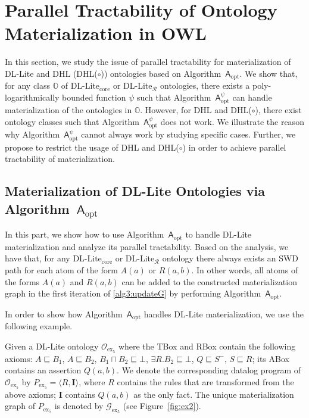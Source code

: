 \section{Parallel Tractability of Ontology Materialization in OWL}
\label{sec:ptonto}

In this section, we study the issue of parallel tractability
for materialization of DL-Lite and DHL (DHL($\circ$)) ontologies
based on Algorithm~$\mathsf{A}_{\text{opt}}$. We show that, for any class $\mathbb{O}$ of
DL-Lite$_{\text{core}}$ or DL-Lite$_\mathcal{R}$ ontologies,
there exists a poly-logarithmically bounded function $\psi$
such that Algorithm~$\mathsf{A}_{\text{opt}}^{\psi}$ can handle materialization of the ontologies in $\mathbb{O}$.
However, for DHL and DHL($\circ$), there exist ontology classes such that Algorithm~$\mathsf{A}_{\text{opt}}^\psi$
does not work. We illustrate the reason why Algorithm~$\mathsf{A}_{\text{opt}}^\psi$ cannot always
work by studying specific cases.
Further, we propose to restrict the usage of DHL and DHL($\circ$) in order to achieve parallel tractability
of materialization.

\subsection{Materialization of DL-Lite Ontologies via Algorithm~$\mathsf{A}_{\text{opt}}$}

In this part, we show how to use Algorithm~$\mathsf{A}_{\text{opt}}$ to handle
DL-Lite materialization and analyze its parallel tractability.
Based on the analysis, we have that, for any DL-Lite$_{\text{core}}$ or DL-Lite$_\mathcal{R}$ ontology
there always exists an SWD path for each atom of the form $A(a)$ or $R(a,b)$.
In other words, all atoms of the forms $A(a)$ and $R(a,b)$ can be added to
the constructed materialization graph in the first iteration of \ref{alg3:updateG}
by performing Algorithm~$\mathsf{A}_{\text{opt}}$.

In order to show how Algorithm~$\mathsf{A}_{\text{opt}}$ handles DL-Lite materialization,
we use the following example.

\begin{example}\label{exp:dllite}
Given a DL-Lite ontology $\mathcal{O}_{\text{ex}_5}$
where the TBox and RBox contain the following axioms:
$A\sqsubseteq B_1$, $A\sqsubseteq B_2$, $B_1\sqcap B_2\sqsubseteq\bot$,
$\exists R.B_2\sqsubseteq\bot$, $Q\sqsubseteq S^-$, $S\sqsubseteq R$;
its ABox contains an assertion $Q(a,b)$.
We denote the corresponding datalog program of $\mathcal{O}_{\text{ex}_5}$ by $P_{\text{ex}_5}=\langle R, \textbf{I}\rangle$,
where $R$ contains the rules that are transformed from the above axioms; $\textbf{I}$ contains $Q(a,b)$
as the only fact.
The unique materialization graph of $P_{\text{ex}_5}$ is denoted by $\mathcal{G}_{\text{ex}_5}$ (see Figure~\ref{fig:ex2}).
\end{example}

